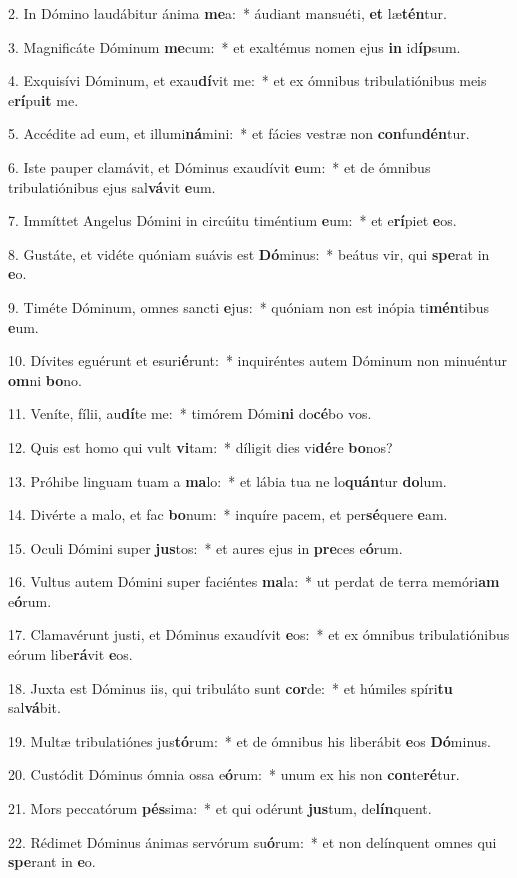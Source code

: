 2. In Dómino laudábitur ánima \textbf{me}a:~*  áudiant mansuéti, \textbf{et} læ\textbf{tén}tur.\

3. Magnificáte Dóminum \textbf{me}cum:~*  et exaltémus nomen ejus \textbf{in} id\textbf{íp}sum.\

4. Exquisívi Dóminum, et exau\textbf{dí}vit me:~*  et ex ómnibus tribulatiónibus meis e\textbf{rí}pu\textbf{it} me.\

5. Accédite ad eum, et illumi\textbf{ná}mini:~*  et fácies vestræ non \textbf{con}fun\textbf{dén}tur.\

6. Iste pauper clamávit, et Dóminus exaudívit \textbf{e}um:~*  et de ómnibus tribulatiónibus ejus sal\textbf{vá}vit \textbf{e}um.\

7. Immíttet Angelus Dómini in circúitu timéntium \textbf{e}um:~*  et e\textbf{rí}piet \textbf{e}os.\

8. Gustáte, et vidéte quóniam suávis est \textbf{Dó}minus:~*  beátus vir, qui \textbf{spe}rat in \textbf{e}o.\

9. Timéte Dóminum, omnes sancti \textbf{e}jus:~*  quóniam non est inópia ti\textbf{mén}tibus \textbf{e}um.\

10. Dívites eguérunt et esuri\textbf{é}runt:~*  inquiréntes autem Dóminum non minuéntur \textbf{om}ni \textbf{bo}no.\

11. Veníte, fílii, au\textbf{dí}te me:~*  timórem Dómi\textbf{ni} do\textbf{cé}bo vos.\

12. Quis est homo qui vult \textbf{vi}tam:~*  díligit dies vi\textbf{dé}re \textbf{bo}nos?\

13. Próhibe linguam tuam a \textbf{ma}lo:~*  et lábia tua ne lo\textbf{quán}tur \textbf{do}lum.\

14. Divérte a malo, et fac \textbf{bo}num:~*  inquíre pacem, et per\textbf{sé}quere \textbf{e}am.\

15. Oculi Dómini super \textbf{jus}tos:~*  et aures ejus in \textbf{pre}ces e\textbf{ó}rum.\

16. Vultus autem Dómini super faciéntes \textbf{ma}la:~*  ut perdat de terra memóri\textbf{am} e\textbf{ó}rum.\

17. Clamavérunt justi, et Dóminus exaudívit \textbf{e}os:~*  et ex ómnibus tribulatiónibus eórum libe\textbf{rá}vit \textbf{e}os.\

18. Juxta est Dóminus iis, qui tribuláto sunt \textbf{cor}de:~*  et húmiles spíri\textbf{tu} sal\textbf{vá}bit.\

19. Multæ tribulatiónes jus\textbf{tó}rum:~*  et de ómnibus his liberábit \textbf{e}os \textbf{Dó}minus.\

20. Custódit Dóminus ómnia ossa e\textbf{ó}rum:~*  unum ex his non \textbf{con}te\textbf{ré}tur.\

21. Mors peccatórum \textbf{pés}sima:~*  et qui odérunt \textbf{jus}tum, de\textbf{lín}quent.\

22. Rédimet Dóminus ánimas servórum su\textbf{ó}rum:~*  et non delínquent omnes qui \textbf{spe}rant in \textbf{e}o.\

